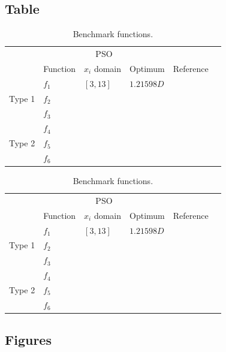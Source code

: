 \documentclass[12pt,a4paper]{article}
\begin{document}
\subsection{Table}
\label{sec:tab}
%
%
\begin{table}[thf]
  \centering
  \begin{tabular}{llllll}
    \hline
   & \multicolumn{3}{c}{PSO}                 &             \\ \cline{2-4}
   & Function & $x_{i}$ domain  & Optimum    & Reference    \\ \hline
\multirow{3}{*}{Type 1} & $f_{1}$  & $[3,13]$        & $1.21598D$ & \cite{KNG:96} \\
   & $f_{2}$ & & &  \\
   & $f_{3}$ & & &  \\ \hline
\multirow{3}{*}{Type 2} & $f_{4}$  &   & & \\
   & $f_{5}$ & & &  \\
   & $f_{6}$ & & &  \\ \hline
  \end{tabular}
  \caption{Benchmark functions.}
\end{table}

% 
%
\begin{table}
  \centering
  \begin{tabular}{llllll}
    \hline
   & \multicolumn{3}{c}{PSO}                 &             \\ \cline{2-4}
   & Function & $x_{i}$ domain  & Optimum    & Reference    \\ \hline
\multirow{3}{*}{Type 1} & $f_{1}$  & $[3,13]$        & $1.21598D$ & \cite{KNG:96} \\
   & $f_{2}$ & & &  \\
   & $f_{3}$ & & &  \\ \hline
\multirow{3}{*}{Type 2} & $f_{4}$  &   & & \\
   & $f_{5}$ & & &  \\
   & $f_{6}$ & & &  \\ \hline
  \end{tabular}
  \caption{Benchmark functions.}
\end{table}

\subsection{Figures}
\label{sec:fig}
\end{document}
